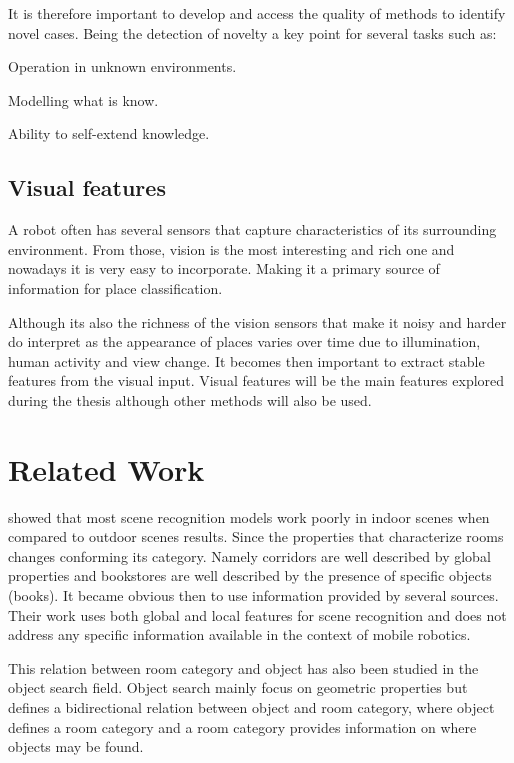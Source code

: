 It is therefore important to develop and access the quality of methods to identify novel cases.
Being the detection of novelty a key point for several tasks such as:
\begin{itemize*}
\item Operation in unknown environments.
\item Modelling what is know.
\item Ability to self-extend knowledge.
\end{itemize*}

\subsection{Visual features}
\label{sec:visual_motivation}
A robot often has several sensors that capture characteristics of its surrounding environment.
From those, vision is the most interesting and rich one and nowadays it is very easy to incorporate.
Making it a primary source of information for place classification.

Although its also the richness of the vision sensors that make it noisy and harder do interpret as the appearance of places varies over time due to illumination, human activity and view change.
It becomes then important to extract stable features from the visual input.
Visual features will be the main features explored during the thesis although other methods will also be used.

\section{Related Work}
\label{sec:related-work}
\cite{quattoni2009recognizing} showed that most scene recognition models work poorly in indoor scenes when compared to outdoor scenes results.
Since the properties that characterize rooms changes conforming its category. Namely corridors are well described by global properties and bookstores are well described by the presence of specific objects (books).
It became obvious then to use information provided by several sources. Their work uses both global and local features for scene recognition and does not address any specific information available in the context of mobile robotics.

This relation between room category and object has also been studied in the object search field.
Object search mainly focus on geometric properties but \cite{galindo2005multi} defines a bidirectional relation between object and room category, where object defines a room category and a room category provides information on where objects may be found.

